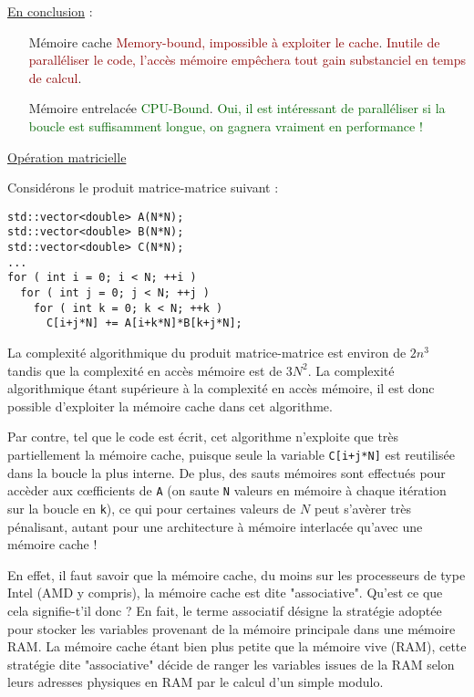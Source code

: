 \documentclass[fleqn,11pt]{article}
\begin{document}
\underline{En conclusion} :
\begin{itemize}
\item [Mémoire cache] \textcolor{darkred}{Memory-bound, impossible à exploiter le cache}. \textcolor{darkred}{Inutile de paralléliser le code, l'accès mémoire empêchera tout gain substanciel en temps de calcul}.
\item [Mémoire entrelacée] \textcolor{darkgreen}{CPU-Bound}. \textcolor{darkgreen}{Oui, il est intéressant de paralléliser si la boucle est suffisamment longue, on gagnera vraiment en performance !}
\end{itemize}

\underline{Opération matricielle}

Considérons le produit matrice-matrice suivant :

\begin{lstlisting}
std::vector<double> A(N*N);
std::vector<double> B(N*N);
std::vector<double> C(N*N);
...
for ( int i = 0; i < N; ++i )
  for ( int j = 0; j < N; ++j )
    for ( int k = 0; k < N; ++k )
      C[i+j*N] += A[i+k*N]*B[k+j*N];
\end{lstlisting}

La complexité algorithmique du produit matrice-matrice est environ de $2n^{3}$ tandis que la complexité en accès
mémoire est de $3N^{2}$. La complexité algorithmique étant supérieure à la complexité en accès mémoire, il est donc possible d'exploiter la mémoire cache dans cet algorithme.

Par contre, tel que le code est écrit, cet algorithme n'exploite que très partiellement la mémoire cache,
puisque seule la variable \texttt{C[i+j*N]} est reutilisée dans la boucle la plus interne. De plus, des sauts
mémoires sont effectués pour accèder aux c{\oe}fficients de \texttt{A} (on saute \texttt{N} valeurs en mémoire à chaque itération sur la boucle en \texttt{k}), ce qui pour certaines valeurs de $N$ peut s'avèrer très pénalisant, autant pour une architecture à mémoire interlacée qu'avec une mémoire cache !

En effet, il faut savoir que la mémoire cache, du moins sur les processeurs de type Intel (AMD y compris),
la mémoire cache est dite "associative". Qu'est ce que cela signifie-t'il donc ? En fait, le terme associatif
désigne la stratégie adoptée pour stocker les variables provenant de la mémoire principale dans une mémoire RAM. La mémoire cache étant bien plus petite que la mémoire vive (RAM), cette stratégie dite "associative"
décide de ranger les variables issues de la RAM selon leurs adresses physiques en RAM par le calcul d'un simple modulo.
\end{document}
